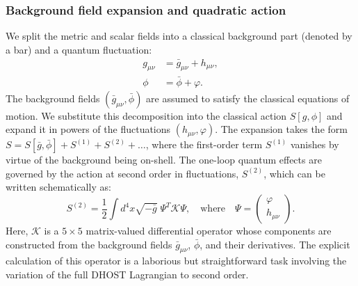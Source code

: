 \documentclass[twocolumn]{aastex631}
\begin{document}
\subsubsection{Background field expansion and quadratic action}
We split the metric and scalar fields into a classical background part (denoted by a bar) and a quantum fluctuation:
\begin{align}
    g_{\mu\nu} &= \bar{g}_{\mu\nu} + h_{\mu\nu}, \\
    \phi &= \bar{\phi} + \varphi.
\end{align}
The background fields $(\bar{g}_{\mu\nu}, \bar{\phi})$ are assumed to satisfy the classical equations of motion. We substitute this decomposition into the classical action $S[g, \phi]$ and expand it in powers of the fluctuations $(h_{\mu\nu}, \varphi)$. The expansion takes the form $S = S[\bar{g}, \bar{\phi}] + S^{(1)} + S^{(2)} + \dots$, where the first-order term $S^{(1)}$ vanishes by virtue of the background being on-shell. The one-loop quantum effects are governed by the action at second order in fluctuations, $S^{(2)}$, which can be written schematically as:
\begin{equation}
    S^{(2)} = \frac{1}{2} \int d^4x \sqrt{-\bar{g}} \; \Psi^T \mathcal{K} \Psi, \quad \text{where} \quad \Psi = \begin{pmatrix} \varphi \\ h_{\mu\nu} \end{pmatrix}.
\end{equation}
Here, $\mathcal{K}$ is a $5 \times 5$ matrix-valued differential operator whose components are constructed from the background fields $\bar{g}_{\mu\nu}$, $\bar{\phi}$, and their derivatives. The explicit calculation of this operator is a laborious but straightforward task involving the variation of the full DHOST Lagrangian to second order.
\end{document}
